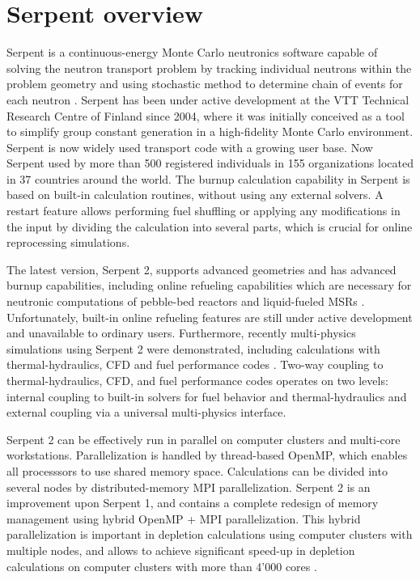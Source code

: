 \section{Serpent overview}
Serpent is a continuous-energy Monte Carlo neutronics software capable of 
solving the neutron transport problem by tracking individual neutrons within 
the problem geometry and using stochastic method to determine chain of events 
for each neutron \cite{leppanen_serpent_2015}. Serpent has been under active 
development at the VTT Technical Research Centre of Finland since 2004, where 
it was initially conceived as a tool to simplify group constant generation in 
a high-fidelity Monte Carlo environment. Serpent is now widely used transport 
code  with a growing user base. Now Serpent used by more than 500 registered 
individuals in 155 organizations located in 37 countries around the world. The 
burnup calculation capability in Serpent is based on built-in calculation 
routines, without using any external solvers. A restart feature allows 
performing fuel shuffling or applying any modifications in the input by 
dividing the calculation into several parts, which is crucial for online 
reprocessing simulations.

The latest version, Serpent 2, supports advanced geometries and has advanced 
burnup capabilities, including online refueling capabilities which are 
necessary for neutronic computations of pebble-bed reactors and liquid-fueled 
\glspl{MSR} \cite{aufiero_extended_2013}. Unfortunately, built-in online 
refueling features are still under active development and unavailable to 
ordinary users. Furthermore, recently multi-physics simulations using Serpent  
2 were demonstrated, including  calculations with thermal-hydraulics, 
\gls{CFD} and fuel performance codes \cite{leppanen_numerical_2015}. Two-way 
coupling to thermal-hydraulics, \gls{CFD}, and fuel performance codes operates 
on two levels: internal coupling to built-in solvers for fuel behavior and 
thermal-hydraulics and external coupling via a universal multi-physics 
interface. 

Serpent 2 can be effectively run in parallel on computer clusters and 
multi-core workstations. Parallelization is handled by thread-based OpenMP, 
which enables all processsors to use shared memory space. Calculations can be 
divided into several nodes by distributed-memory \gls{MPI} parallelization. 
Serpent 2  is an improvement upon Serpent 1, and contains a complete redesign 
of memory management using hybrid OpenMP \cite{dagum_openmp_1998} + \gls{MPI} 
parallelization.  This hybrid parallelization is important in depletion 
calculations using computer clusters with multiple nodes, and allows to 
achieve significant speed-up in depletion calculations on computer clusters 
with more than 4'000 cores \cite{leppanen_serpent_2015}. 


